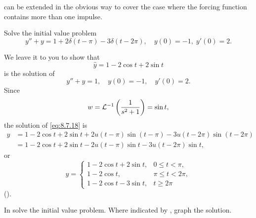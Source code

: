  can be extended in the obvious way to cover
the case where the forcing function contains more than one impulse.

\begin{example}\label{example:8.7.3}
Solve the  initial value problem
\begin{equation} \label{eq:8.7.18}
y''+y=1+2\delta(t-\pi)-3\delta(t-2\pi), \quad    y(0)=-1,\;   y'(0)=2.
\end{equation}
\end{example}

\begin{solution}
We leave it to you to show that
\[
\hat y= 1-2\cos t+2\sin t
\]
is the solution of
\[
y''+y=1, \quad    y(0)=-1,\quad    y'(0)=2.
\]
Since
\[
w={\mathcal L}^{-1}\left(\frac{1}{s^2+1}\right)=\sin t,
\]
the solution of  \eqref{eq:8.7.18} is
\begin{align*}
y&=1-2\cos t+2\sin t+2u(t-\pi)\sin(t-\pi)-3u(t-2\pi)\sin(t-2\pi)\\
&=1-2\cos t+2\sin t-2u(t-\pi)\sin t-3u(t-2\pi)\sin t,
\end{align*}
or
\begin{equation} \label{eq:8.7.19}
y=\begin{cases} 1-2\cos t+2\sin t,&0\le t<\pi,\\
1-2\cos t,&\pi\le t<2\pi,\\
1-2\cos t-3\sin t,&t\ge 2\pi
\end{cases}
\end{equation}
().
\end{solution}


\exercises
In  solve the initial value
problem. Where indicated by \CGex, graph the solution.

